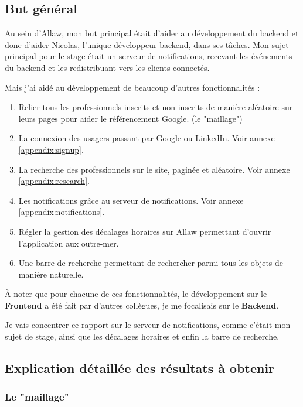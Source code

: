 
\subsection{But général}

Au sein d'Allaw, mon but principal était d'aider au développement du backend
et donc d'aider Nicolas, l'unique développeur backend, dans ses tâches. Mon
sujet principal pour le stage était un serveur de notifications, recevant les
événements du backend et les redistribuant vers les clients connectés.

Mais j'ai aidé au développement de beaucoup d'autres fonctionnalités :

\begin{enumerate}
    \item Relier tous les professionnels inscrits et non-inscrits de manière aléatoire sur
          leurs pages pour aider le référencement Google. (le "maillage")
	\item La connexion des usagers passant par Google ou LinkedIn. Voir annexe \ref{appendix:signup}.
    \item La recherche des professionnels sur le site, paginée et aléatoire. Voir annexe \ref{appendix:research}.
	\item Les notifications grâce au serveur de notifications. Voir annexe \ref{appendix:notifications}.
	\item Régler la gestion des décalages horaires sur Allaw permettant d'ouvrir l'application aux outre-mer.
	\item Une barre de recherche permettant de rechercher parmi tous les objets de manière naturelle.
\end{enumerate}

À noter que pour chacune de ces fonctionnalités, le développement sur le {\bf
Frontend} a été fait par d'autres collègues, je me focalisais sur le {\bf
Backend}.

Je vais concentrer ce rapport sur le serveur de notifications, comme c'était mon
sujet de stage, ainsi que les décalages horaires et enfin la barre de recherche.

\subsection{Explication détaillée des résultats à obtenir}

\subsubsection{Le "maillage"}

